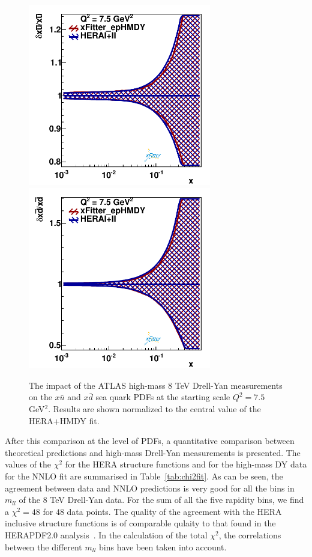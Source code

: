 \begin{figure}[t]
\centering
\includegraphics[width=8cm]{figs/q2_7_5_pdf_ubar_ratio.pdf}
\includegraphics[width=8cm]{figs/q2_7_5_pdf_dbar_ratio.pdf} 
\caption{The impact of the ATLAS high-mass 8 TeV Drell-Yan measurements
  on the $x\bar{u}$ and $x\bar{d}$ sea quark PDFs at the starting scale $Q^2=7.5$ GeV$^2$.
  Results are shown normalized to the central value of the HERA+HMDY
  fit.  }
\label{fig:QCDfit}
\end{figure}

After this comparison at the level of PDFs, a quantitative comparison
between theoretical predictions and high-mass Drell-Yan measurements is presented.
%
The values of the $\chi^2$ for the HERA structure functions and for
the high-mass DY data for the NNLO fit are summarised in
Table~\ref{tab:chi2fit}.
%
As can be seen, the agreement between data and NNLO predictions is
very good for all the bins in $m_{ll}$ of the $8$ TeV Drell-Yan data.
%
For the sum of all the five rapidity bins, we find a $\chi^2=48$ for
$48$ data points.
%
The quality of the agreement with the HERA inclusive structure
functions is of comparable qulaity to that found in the HERAPDF2.0 analysis~\cite{}.
%
In the calculation of the total $\chi^2$, the correlations between the
different $m_{ll}$ bins have been taken into account.

